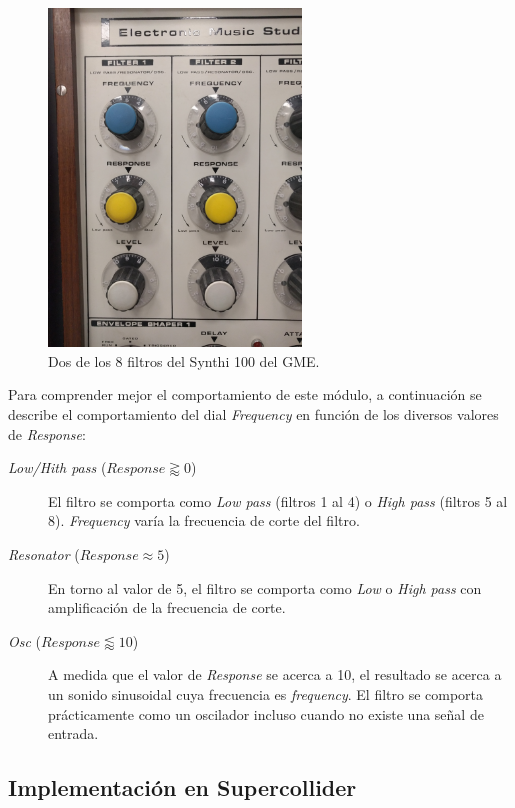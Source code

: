 \begin{figure}
	\centering
	\includegraphics[width=0.6\textwidth]{images/filters}
	\caption{Dos de los 8 filtros del Synthi 100 del GME.}
	\label{fig:filters}
\end{figure}

Para comprender mejor el comportamiento de este módulo, a continuación se describe el comportamiento del dial \textit{Frequency} en función de los diversos valores de \textit{Response}:

\begin{description}
	\item[\textit{Low/Hith pass} ($\textit{Response} \gtrapprox 0$)] El filtro se comporta como \textit{Low pass} (filtros 1 al 4) o \textit{High pass} (filtros 5 al 8). \textit{Frequency} varía la frecuencia de corte del filtro.
	\item[\textit{Resonator} ($\textit{Response} \approx 5$)] En torno al valor de 5, el filtro se comporta como \textit{Low} o \textit{High pass} con amplificación de la frecuencia de corte.
	\item[\textit{Osc} ($\textit{Response} \lessapprox 10$)] A medida que el valor de \textit{Response} se acerca a 10, el resultado se acerca a un sonido sinusoidal cuya frecuencia es \textit{frequency}. El filtro se comporta prácticamente como un oscilador incluso cuando no existe una señal de entrada. 
\end{description}

\subsection{Implementación en Supercollider}


